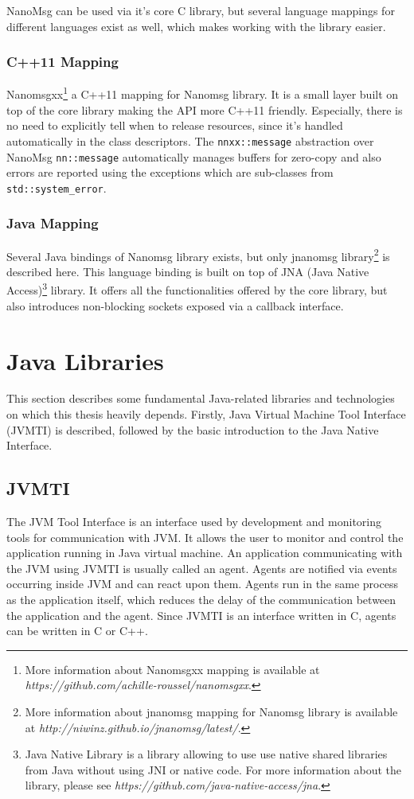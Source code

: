 NanoMsg can be used via it's core C library, but several language mappings for different languages exist as well, which makes working with the library easier.
\subsubsection{C++11 Mapping}
Nanomsgxx\footnote{More information about Nanomsgxx mapping is available at \textit{https://github.com/achille-roussel/nanomsgxx}.} a C++11 mapping for Nanomsg library. It is a small layer built on top of the core library making the API more C++11  friendly. Especially, there is no need to explicitly tell when to release resources, since it's handled automatically in the class descriptors. The \texttt{nnxx::message} abstraction over NanoMsg \texttt{nn::message} automatically manages buffers for zero-copy and also errors are reported using the exceptions which are sub-classes from \texttt{std::system\_error}.
\subsubsection{Java Mapping}
Several Java bindings of Nanomsg library exists, but only jnanomsg library\footnote{More information about jnanomsg mapping for Nanomsg library is available at \textit{http://niwinz.github.io/jnanomsg/latest/}.}  is described here. This language binding is built on top of JNA (Java Native Access)\footnote{Java Native Library is a library allowing to use use native shared libraries from Java without using JNI or native code. For more information about the library, please see \textit{https://github.com/java-native-access/jna}.} library. It offers all the functionalities offered by the core library, but also introduces non-blocking sockets exposed via a callback interface.

\section{Java Libraries}
This section describes some fundamental Java-related libraries and technologies on which this thesis heavily depends. Firstly, Java Virtual Machine Tool Interface (JVMTI) is described, followed by the basic introduction to the Java Native Interface.
\subsection{JVMTI}
\label{JVMTI}
The JVM Tool Interface is an interface used by development and monitoring tools for communication with JVM. It allows the user to monitor and control the application running in Java virtual machine. An application communicating with the JVM using JVMTI is usually called an agent. Agents are notified via events occurring inside JVM and can react upon them. Agents run in the same process as the application itself, which reduces the delay of the communication between the application and the agent. Since JVMTI is an interface written in C, agents can be written in C or C++. 

